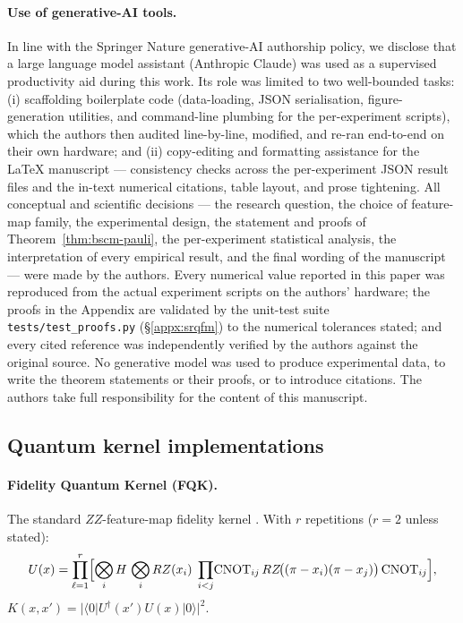 \documentclass[pdflatex,sn-mathphys]{sn-jnl}
\theoremstyle{plain}
\theoremstyle{remark}
\theoremstyle{definition}
\begin{document}
\paragraph{Use of generative-AI tools.}
In line with the Springer Nature generative-AI authorship policy, we disclose that a large language model assistant (Anthropic Claude) was used as a supervised productivity aid during this work.  Its role was limited to two well-bounded tasks: (i) scaffolding boilerplate code (data-loading, JSON serialisation, figure-generation utilities, and command-line plumbing for the per-experiment scripts), which the authors then audited line-by-line, modified, and re-ran end-to-end on their own hardware; and (ii) copy-editing and formatting assistance for the LaTeX manuscript --- consistency checks across the per-experiment JSON result files and the in-text numerical citations, table layout, and prose tightening.
%
All conceptual and scientific decisions --- the research question, the choice of feature-map family, the experimental design, the statement and proofs of Theorem~\ref{thm:bscm-pauli}, the per-experiment statistical analysis, the interpretation of every empirical result, and the final wording of the manuscript --- were made by the authors.  Every numerical value reported in this paper was reproduced from the actual experiment scripts on the authors' hardware; the proofs in the Appendix are validated by the unit-test suite \texttt{tests/test\_proofs.py} (\S\ref{appx:srqfm}) to the numerical tolerances stated; and every cited reference was independently verified by the authors against the original source.  No generative model was used to produce experimental data, to write the theorem statements or their proofs, or to introduce citations.  The authors take full responsibility for the content of this manuscript.

\subsection{Quantum kernel implementations}\label{sec:kernels}

\paragraph{Fidelity Quantum Kernel (FQK).}
The standard $ZZ$-feature-map fidelity kernel \cite{havlicek2019,schuld2019}. With $r$ repetitions ($r=2$ unless stated):
\[
U(x) = \prod_{\ell=1}^{r}\Bigl[\bigotimes_i H \,\bigotimes_i RZ(x_i)\;
\prod_{i<j}\!\mathrm{CNOT}_{ij}\,RZ\!\bigl((\pi-x_i)(\pi-x_j)\bigr)
\,\mathrm{CNOT}_{ij}\Bigr],
\]
$K(x,x')=|\langle 0|U^\dagger(x')U(x)|0\rangle|^2$.
\end{document}
